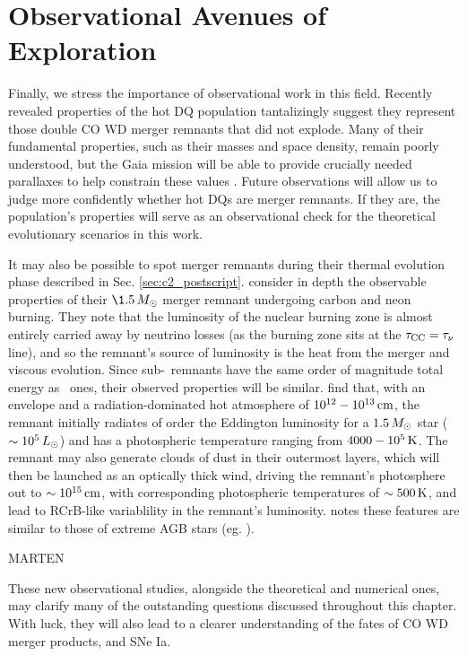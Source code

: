 \section{Observational Avenues of Exploration}

Finally, we stress the importance of observational work in this field.  Recently revealed properties of the hot DQ population tantalizingly suggest they represent those double CO WD merger remnants that did not explode.  Many of their fundamental properties, such as their masses and space density, remain poorly understood, but the Gaia mission will be able to provide crucially needed parallaxes to help constrain these values \citep{dunl15thesis}.  Future observations will allow us to judge more confidently whether hot DQs are merger remnants.  If they are, the population's properties will serve as an observational check for the theoretical evolutionary scenarios in this work.

It may also be possible to spot merger remnants during their thermal evolution phase described in Sec. \ref{sec:c2_postscript}.  \cite{schw+16} consider in depth the observable properties of their $\1.5\,\Msun$ merger remnant undergoing carbon and neon burning.  They note that the luminosity of the nuclear burning zone is almost entirely carried away by neutrino losses (as the burning zone sits at the $\taucc = \taunu$ line), and so the remnant's source of luminosity is the heat from the merger and viscous evolution.  Since sub-\Mch\ remnants have the same order of magnitude total energy as \Mch\ ones, their observed properties will be similar.  \cite{schw+16} find that, with an envelope and a radiation-dominated hot atmosphere of $10^{12}-10^{13}\,\mathrm{cm}$, the remnant initially radiates of order the Eddington luminosity for a $1.5\,\Msun$ star ($\sim10^5\,\Lsun$) and has a photospheric temperature ranging from $4000 - 10^5\,\mathrm{K}$.  The remnant may also generate clouds of dust in their outermost layers, which will then be launched as an optically thick wind, driving the remnant's photosphere out to $\sim10^{15}\,\mathrm{cm}$, with corresponding photospheric temperatures of $\sim500\,\mathrm{K}$, and lead to RCrB-like variablility in the remnant's luminosity.  \citep{schw+16} notes these features are similar to those of extreme AGB stars (eg. \citealt{blum+06}).

{\charles MARTEN}

These new observational studies, alongside the theoretical and numerical ones, may clarify many of the outstanding questions discussed throughout this chapter.  With luck, they will also lead to a clearer understanding of the fates of CO WD merger products, and SNe Ia.

